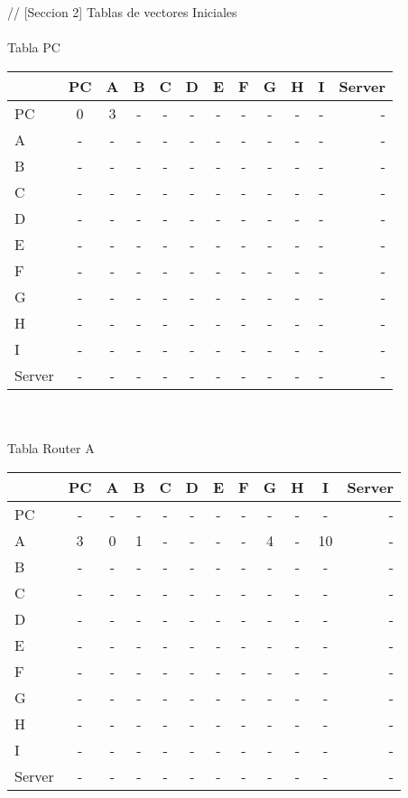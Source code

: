 \documentclass{article}
\begin{document}
//
[Seccion 2]
\subitem Tablas de vectores Iniciales\\
\\
Tabla PC\\
\begin{tabular}{l*{10}{c}r}
              & PC & A & B & C & D & E & F  & G & H & I & Server \\
\hline
PC             & 0 & 3 & - & - & - & - & - & - & - & - & - \\
A              & - & - & - & - & - & - & - & - & - & - & - \\
B              & - & - & - & - & - & - & - & - & - & - & - \\
C              & - & - & - & - & - & - & - & - & - & - & - \\
D              & - & - & - & - & - & - & - & - & - & - & - \\
E              & - & - & - & - & - & - & - & - & - & - & - \\
F              & - & - & - & - & - & - & - & - & - & - & - \\
G              & - & - & - & - & - & - & - & - & - & - & - \\
H              & - & - & - & - & - & - & - & - & - & - & - \\
I              & - & - & - & - & - & - & - & - & - & - & - \\
Server         & - & - & - & - & - & - & - & - & - & - & - \\	

\end{tabular}
\\
\\
Tabla Router A  \\
\begin{tabular}{l*{10}{c}r}
              & PC & A & B & C & D & E & F & G & H & I & Server \\
\hline
PC             & - & - & - & - & - & - & - & - & - & - & -\\
A              & 3 & 0 & 1 & - & - & - & - & 4 & - & 10 & -\\
B              & - & - & - & - & - & - & - & - & - & - & -\\
C              & - & - & - & - & - & - & - & - & - & - & -\\
D              & - & - & - & - & - & - & - & - & - & - & -\\
E              & - & - & - & - & - & - & - & - & - & - & -\\
F              & - & - & - & - & - & - & - & - & - & - & -\\
G              & - & - & - & - & - & - & - & - & - & - & -\\
H              & - & - & - & - & - & - & - & - & - & - & -\\
I              & - & - & - & - & - & - & - & - & - & - & -\\
Server         & - & - & - & - & - & - & - & - & - & - & -\\

\end{tabular}
\end{document}
